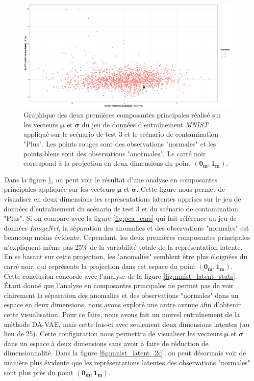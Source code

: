 \begin{figure}[htb]
	\centering
	\centering\includegraphics[width=\linewidth]{images/plot_pca_mnist}
	\caption[Graphique des deux premières composantes principales réalisé sur les vecteurs $\boldsymbol{\mu}$ et $\boldsymbol{\sigma}$ du jeu de données d'entraînement \textit{MNIST}.]{Graphique des deux premières composantes principales réalisé sur les vecteurs $\boldsymbol{\mu}$ et $\boldsymbol{\sigma}$ du jeu de données d'entraînement \textit{MNIST} appliqué sur le scénario de test 3 et le scénario de contamination "Plus". Les points rouges sont des observations "normales" et les points bleus sont des observations "anormales". Le carré noir correspond à la projection en deux dimensions du point $(\boldsymbol{0_{m}}, \boldsymbol{1_{m}})$.}
	\label{fig:pca_mnist}
\end{figure}

Dans la figure \ref{fig:pca_mnist}, on peut voir le résultat d'une analyse en composantes principales appliquée sur les vecteurs $\boldsymbol{\mu}$ et $\boldsymbol{\sigma}$. Cette figure nous permet de visualiser en deux dimensions les représentations latentes apprises sur le jeu de données d'entraînement du scénario de test 3 et du scénario de contamination "Plus". Si on compare avec la figure \ref{fig:pca_cars} qui fait référence au jeu de données \textit{ImageNet}, la séparation des anomalies et des observations "normales" est beaucoup moins évidente. Cependant, les deux premières composantes principales n'expliquent même pas 25\% de la variabilité totale de la représentation latente. En se basant sur cette projection, les "anomalies" semblent être plus éloignées du carré noir, qui représente la projection dans cet espace du point $(\boldsymbol{0_{m}}, \boldsymbol{1_{m}})$. Cette conclusion concorde avec l'analyse de la figure \ref{fig:mnist_latent_stats}. Étant donné que l'analyse en composantes principales ne permet pas de voir clairement la séparation des anomalies et des observations "normales" dans un espace en deux dimensions, nous avons exploré une autre avenue afin d'obtenir cette visualisation. Pour ce faire, nous avons fait un nouvel entraînement de la méthode DA-VAE, mais cette fois-ci avec seulement deux dimensions latentes (au lieu de 25). Cette configuration nous permettra de visualiser les vecteurs $\boldsymbol{\mu}$ et $\boldsymbol{\sigma}$ dans un espace à deux dimensions sans avoir à faire de réduction de dimensionnalité. Dans la figure \ref{fig:mnist_latent_2d}, on peut désormais voir de manière plus évidente que les représentations latentes des observations "normales" sont plus près du point $(\boldsymbol{0_{m}}, \boldsymbol{1_{m}})$.

